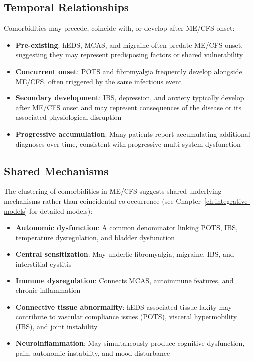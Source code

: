 \subsection{Temporal Relationships}

Comorbidities may precede, coincide with, or develop after ME/CFS onset:

\begin{itemize}
    \item \textbf{Pre-existing}: hEDS, MCAS, and migraine often predate ME/CFS onset, suggesting they may represent predisposing factors or shared vulnerability
    \item \textbf{Concurrent onset}: POTS and fibromyalgia frequently develop alongside ME/CFS, often triggered by the same infectious event
    \item \textbf{Secondary development}: IBS, depression, and anxiety typically develop after ME/CFS onset and may represent consequences of the disease or its associated physiological disruption
    \item \textbf{Progressive accumulation}: Many patients report accumulating additional diagnoses over time, consistent with progressive multi-system dysfunction
\end{itemize}

\subsection{Shared Mechanisms}

The clustering of comorbidities in ME/CFS suggests shared underlying mechanisms rather than coincidental co-occurrence (see Chapter~\ref{ch:integrative-models} for detailed models):

\begin{itemize}
    \item \textbf{Autonomic dysfunction}: A common denominator linking POTS, IBS, temperature dysregulation, and bladder dysfunction
    \item \textbf{Central sensitization}: May underlie fibromyalgia, migraine, IBS, and interstitial cystitis
    \item \textbf{Immune dysregulation}: Connects MCAS, autoimmune features, and chronic inflammation
    \item \textbf{Connective tissue abnormality}: hEDS-associated tissue laxity may contribute to vascular compliance issues (POTS), visceral hypermobility (IBS), and joint instability
    \item \textbf{Neuroinflammation}: May simultaneously produce cognitive dysfunction, pain, autonomic instability, and mood disturbance
\end{itemize}

